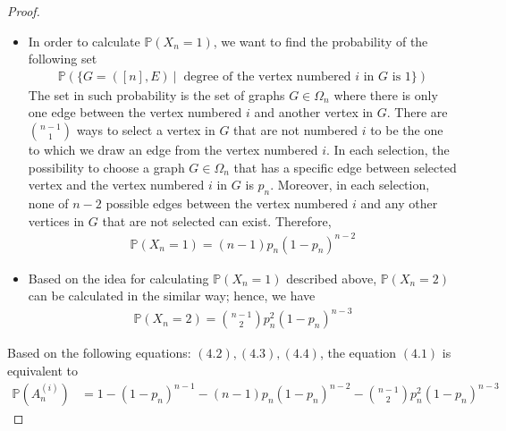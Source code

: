 \begin{proof}
\begin{itemize}
      \begin{align*}
        \mathbb{P}(\{G = ([n],E) \ | \ \text{ degree of the vertex numbered $i$ in $G$ is $0$}\})
      \end{align*}
      The set in such probability is the set of graphs $G \in \Omega_{n}$ where none of $n-1$ possible edges between the vertex numbered $i$ and any other vertices in $G$ can exist. Moreover, the probability of choosing a graph $G \in \Omega_{n}$ that does not have a specific edge is $1 - p_{n}$; hence,
      \begin{align*}
        \mathbb{P}(X_{n} = 0) = (1-p_{n})^{n-1} \tag{4.2}
      \end{align*}
    \item In order to calculate $\mathbb{P}(X_{n} = 1)$, we want to find the probability of the following set
      \begin{align*}
        \mathbb{P}(\{G = ([n],E) \ | \ \text{ degree of the vertex numbered $i$ in $G$ is $1$}\})
      \end{align*}
      The set in such probability is the set of graphs $G \in \Omega_{n}$ where there is only one edge between the vertex numbered $i$ and another vertex in $G$. There are $\binom{n-1}{1}$ ways to select a vertex in $G$ that are not numbered $i$ to be the one to which we draw an edge from the vertex numbered $i$. In each selection, the possibility to choose a graph $G \in \Omega_{n}$ that has a specific edge between selected vertex and the vertex numbered $i$ in $G$ is $p_{n}$. Moreover, in each selection, none of $n-2$ possible edges between the vertex numbered $i$ and any other vertices in $G$ that are not selected can exist. Therefore,
      \begin{align*}
        \mathbb{P}(X_{n} = 1) = (n-1) p_{n} (1- p_{n})^{n-2} \tag{4.3}
      \end{align*}
    \item Based on the idea for calculating $\mathbb{P}(X_{n} = 1)$ described above, $\mathbb{P}(X_{n} = 2)$ can be calculated in the similar way; hence, we have
      \begin{align*}
        \mathbb{P}(X_{n} = 2) = \binom{n - 1}{2} p_{n}^{2} (1 - p_{n})^{n - 3} \tag{4.4}
      \end{align*}
  \end{itemize}
  Based on the following equations: $(4.2), (4.3), (4.4)$, the equation $(4.1)$ is equivalent to
  \begin{align*}
    \mathbb{P}(A_{n}^{(i)}) &= 1 - (1 - p_{n})^{n-1} - (n-1) p_{n} (1 - p_{n})^{n-2} - \binom{n - 1}{2} p_{n}^{2} (1 - p_{n})^{n-3} \tag{4.5}

\end{align*}
\end{proof}

